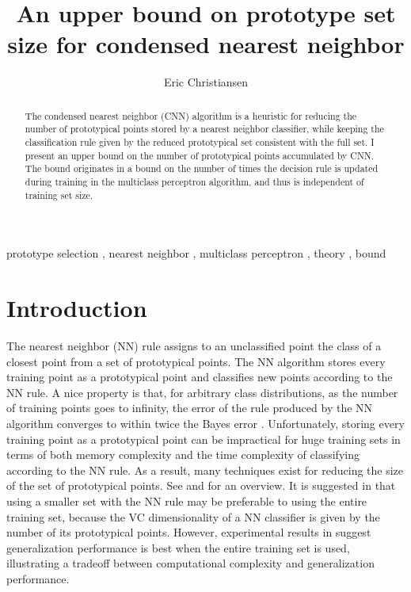 \documentclass[preprint]{elsarticle}
\begin{document}
\begin{frontmatter}
\title{An upper bound on prototype set size for condensed nearest neighbor}
\author{Eric Christiansen}

\begin{abstract}
The condensed nearest neighbor (CNN) algorithm is a heuristic for reducing the number of prototypical points stored by a nearest neighbor classifier, while keeping the classification rule given by the reduced prototypical set consistent with the full set.
I present an upper bound on the number of prototypical points accumulated by CNN. The bound originates in a bound on the number of times the decision rule is updated during training in the multiclass perceptron algorithm, and thus is independent of training set size.
\end{abstract}

\begin{keyword}
prototype selection \sep
nearest neighbor \sep
multiclass perceptron \sep
theory \sep
bound
\end{keyword}


\end{frontmatter}

\section{Introduction}
The nearest neighbor (NN) rule assigns to an unclassified point the class of a closest point from a set of prototypical points. The NN algorithm stores every training point as a prototypical point and classifies new points according to the NN rule. 
A nice property is that, for arbitrary class distributions, as the number of training points goes to infinity, the error of the rule produced by the NN algorithm converges to within twice the Bayes error \cite{Devroye}. 
Unfortunately, storing every training point as a prototypical point can be impractical for huge training sets in terms of both memory complexity and the time complexity of classifying according to the NN rule. As a result, many techniques exist for reducing the size of the set of prototypical points. See \cite{Wilson} and \cite{Toussaint} for an overview. It is suggested in \cite{Angiulli} that using a smaller set with the NN rule may be preferable to using the entire training set, because the VC dimensionality of a NN classifier is given by the number of its prototypical points. However, experimental results in \cite{Wilson} suggest generalization performance is best when the entire training set is used, illustrating a tradeoff between computational complexity and generalization performance. 
\end{document}
